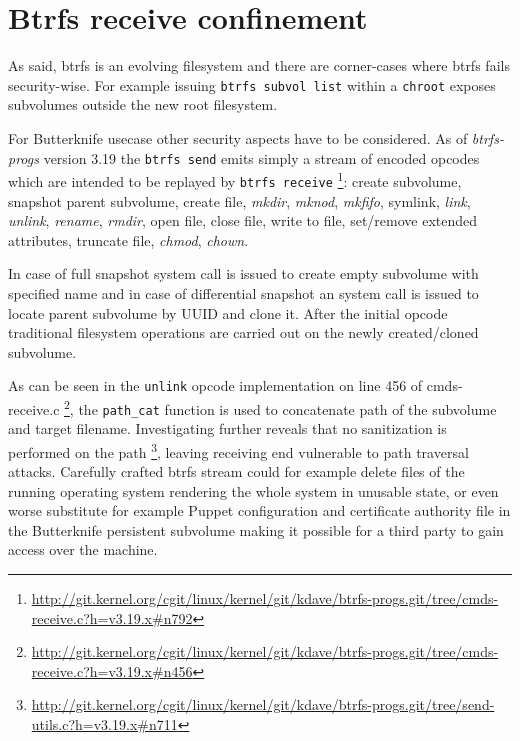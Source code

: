 \documentclass[a4paper,11pt]{kth-mag}
\begin{document}
\section{Btrfs receive confinement}

As said, \acrshort{btrfs} is an evolving filesystem and there
are corner-cases where \acrshort{btrfs} fails security-wise.
For example issuing \lstinline!btrfs subvol list! within
a \lstinline!chroot! exposes subvolumes outside the new root filesystem.

For Butterknife usecase other security aspects have to be considered.
As of \emph{btrfs-progs} version 3.19 the \lstinline!btrfs send!
emits simply a stream of encoded opcodes
which are intended to be replayed by \lstinline!btrfs receive!
\footnote{\url{http://git.kernel.org/cgit/linux/kernel/git/kdave/btrfs-progs.git/tree/cmds-receive.c?h=v3.19.x\#n792}}:
create subvolume, snapshot parent subvolume,
create file, \emph{mkdir}, \emph{mknod}, \emph{mkfifo}, symlink,
\emph{link}, \emph{unlink}, \emph{rename}, \emph{rmdir}, open file,
close file, write to file, set/remove extended attributes,
truncate file, \emph{chmod}, \emph{chown}.

In case of full snapshot system call is issued to
create empty subvolume with specified name and
in case of differential snapshot an system call is issued
to locate parent subvolume by UUID and clone it.
After the initial opcode traditional filesystem
operations are carried out on the newly
created/cloned subvolume.

As can be seen in the \lstinline!unlink! opcode
implementation on line 456 of cmds-receive.c
\footnote{\url{http://git.kernel.org/cgit/linux/kernel/git/kdave/btrfs-progs.git/tree/cmds-receive.c?h=v3.19.x\#n456}},
the \lstinline!path_cat! function is used to concatenate
path of the subvolume and target filename.
Investigating further reveals that no sanitization is performed on the path
\footnote{\url{http://git.kernel.org/cgit/linux/kernel/git/kdave/btrfs-progs.git/tree/send-utils.c?h=v3.19.x\#n711}}, leaving receiving end vulnerable to path traversal attacks.
Carefully crafted \acrshort{btrfs} stream could for example delete files
of the running operating system rendering the whole system
in unusable state, or even worse substitute for example
Puppet configuration and certificate authority file in the
Butterknife persistent subvolume making it possible for a third party
to gain access over the machine.
\end{document}
